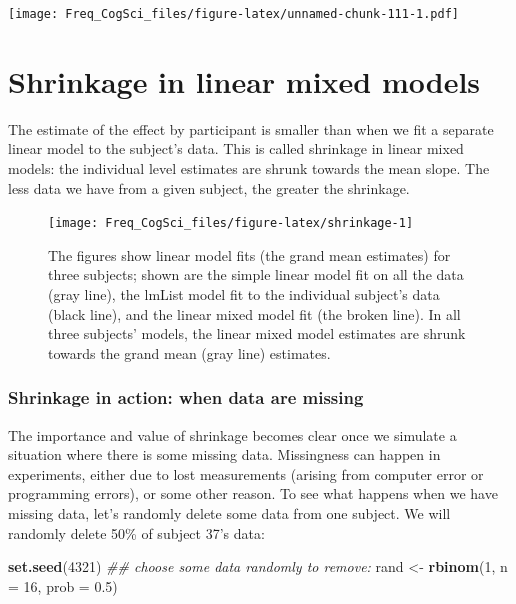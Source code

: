 \documentclass[12pt,]{krantz}
\newenvironment{Shaded}{\begin{snugshade}}{\end{snugshade}}
\newcommand{\CommentTok}[1]{\textcolor[rgb]{0.56,0.35,0.01}{\textit{#1}}}
\newcommand{\DataTypeTok}[1]{\textcolor[rgb]{0.13,0.29,0.53}{#1}}
\newcommand{\DecValTok}[1]{\textcolor[rgb]{0.00,0.00,0.81}{#1}}
\newcommand{\FloatTok}[1]{\textcolor[rgb]{0.00,0.00,0.81}{#1}}
\newcommand{\KeywordTok}[1]{\textcolor[rgb]{0.13,0.29,0.53}{\textbf{#1}}}
\newcommand{\NormalTok}[1]{#1}
\newcommand{\StringTok}[1]{\textcolor[rgb]{0.31,0.60,0.02}{#1}}
\begin{document}
\texttt{[image: Freq\_CogSci\_files/figure-latex/unnamed-chunk-111-1.pdf]}

\hypertarget{shrinkage-in-linear-mixed-models}{%
\section{Shrinkage in linear mixed models}\label{shrinkage-in-linear-mixed-models}}

The estimate of the effect by participant is smaller than when we fit a separate linear model to the subject's data.
This is called shrinkage in linear mixed models: the individual level estimates are shrunk towards the mean slope.
The less data we have from a given subject, the greater the shrinkage.

\begin{figure}
\texttt{[image: Freq\_CogSci\_files/figure-latex/shrinkage-1]} \caption{The figures show linear model fits (the grand mean estimates) for three subjects; shown are the simple linear model fit on all the data (gray line), the lmList model fit to the individual subject's data (black line), and the linear mixed model fit (the broken line). In all three subjects' models, the linear mixed model estimates are shrunk towards the grand mean (gray line) estimates.}\label{fig:shrinkage}
\end{figure}

\hypertarget{shrinkage-in-action-when-data-are-missing}{%
\subsubsection{Shrinkage in action: when data are missing}\label{shrinkage-in-action-when-data-are-missing}}

The importance and value of shrinkage becomes clear once we simulate a situation where there is some missing data. Missingness can happen in experiments, either due to lost measurements (arising from computer error or programming errors), or some other reason. To see what happens when we have missing data, let's randomly delete some data from one subject. We will randomly delete 50\% of subject 37's data:

\begin{Shaded}
\begin{Highlighting}[]
\KeywordTok{set.seed}\NormalTok{(}\DecValTok{4321}\NormalTok{)}
\CommentTok{## choose some data randomly to remove:}
\NormalTok{rand <-}\StringTok{ }\KeywordTok{rbinom}\NormalTok{(}\DecValTok{1}\NormalTok{, }\DataTypeTok{n =} \DecValTok{16}\NormalTok{, }\DataTypeTok{prob =} \FloatTok{0.5}\NormalTok{)}
\end{Highlighting}
\end{Shaded}
\end{document}
